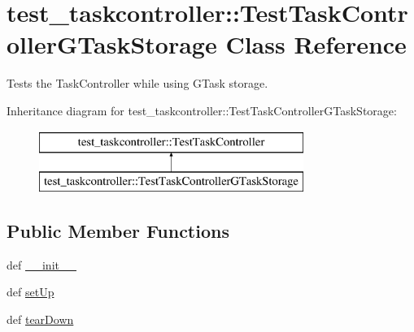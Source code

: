 \hypertarget{classtest__taskcontroller_1_1TestTaskControllerGTaskStorage}{
\section{test\-\_\-taskcontroller\-:\-:\-Test\-Task\-Controller\-G\-Task\-Storage \-Class \-Reference}
\label{classtest__taskcontroller_1_1TestTaskControllerGTaskStorage}
}


\-Tests the \-Task\-Controller while using \-G\-Task storage.  


\-Inheritance diagram for test\-\_\-taskcontroller\-:\-:\-Test\-Task\-Controller\-G\-Task\-Storage\-:\begin{figure}[H]
\begin{center}
\leavevmode
\includegraphics[height=2.000000cm]{classtest__taskcontroller_1_1TestTaskControllerGTaskStorage}
\end{center}
\end{figure}
\subsection*{\-Public \-Member \-Functions}
\begin{DoxyCompactItemize}
\item 
def \hyperlink{classtest__taskcontroller_1_1TestTaskControllerGTaskStorage_a6486ee999987082360633f99b887af86}{\-\_\-\-\_\-init\-\_\-\-\_\-}
\item 
def \hyperlink{classtest__taskcontroller_1_1TestTaskControllerGTaskStorage_a303ff45836c0c66b699198f28e175919}{set\-Up}
\item 
def \hyperlink{classtest__taskcontroller_1_1TestTaskControllerGTaskStorage_aec5a09686478b70dfc45ce1bb8d22391}{tear\-Down}
\end{DoxyCompactItemize}
